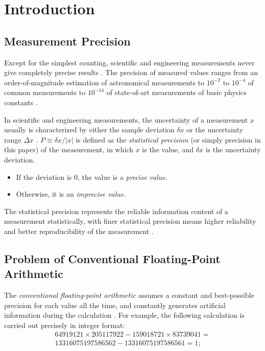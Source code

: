 \documentclass[twoside]{article}
\numberwithin{equation}{section}
\begin{document}
\clearpage
\section{Introduction}
\label{sec: introduction}

\subsection{Measurement Precision}

Except for the simplest counting, scientific and engineering measurements never give completely precise results \cite{Statistical_Methods}\cite{Precisions_Physical_Measurements}.  
The precision of measured values ranges from an order-of-magnitude estimation of astronomical measurements to $10^{-2}$ to $10^{-4}$ of common measurements to $10^{-14}$ of state-of-art measurements of basic physics constants \cite{Basic_Constants_Measurements}.  

In scientific and engineering measurements, the uncertainty of a measurement $x$ usually is characterized by either the sample deviation $\delta x$ or the uncertainty range $\Delta x$ \cite{Statistical_Methods}\cite{Precisions_Physical_Measurements}\cite{Probability_Statistics}.  
$P \equiv \delta x / |x|$ is defined as the \emph{statistical precision} (or simply precision in this paper) of the measurement, in which $x$ is the value, and $\delta x$ is the uncertainty deviation.
\begin{itemize}
\item If the deviation is 0, the value is a \emph{precise value}.

\item Otherwise, it is an \emph{imprecise value}.
\end{itemize}
The statistical precision represents the reliable information content of a measurement statistically, with finer statistical precision means higher reliability and better reproducibility of the measurement \cite{Statistical_Methods}\cite{Precisions_Physical_Measurements}.  
 


\subsection{Problem of Conventional Floating-Point Arithmetic}

The \emph{conventional floating-point arithmetic} \cite{Computer_Architecture}\cite{Floating_Point_Arithmetic}\cite{Floating_Point_Standard} assumes a constant and best-possible precision for each value all the time, and constantly generates artificial information during the calculation \cite{Arithmetic_Digital_Computers}.  
For example, the following calculation is carried out precisely in integer format:
\begin{multline}
\label{eqn: int num calc}
64919121 \times 205117922 - 159018721 \times 83739041=\\
13316075197586562 - 13316075197586561 = 1;
\end{multline}
\end{document}
